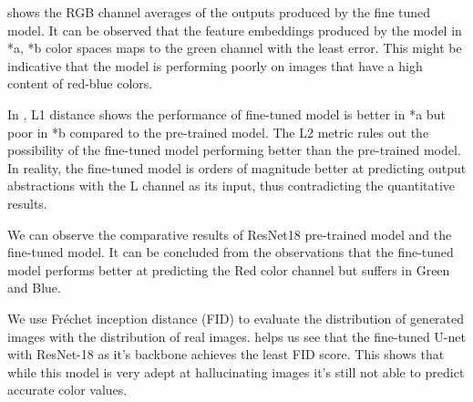 \documentclass[10pt,twocolumn,letterpaper]{article}
\begin{document}
    
     shows the RGB channel averages of the outputs produced by the fine tuned model. It can be observed that the feature embeddings produced by the model in *a, *b color spaces maps to the green channel with the least error. This might be indicative that the model is performing poorly on images that have a high content of red-blue colors. 
     
In , L1 distance shows the performance of fine-tuned model is better in *a but poor in *b compared to the pre-trained model. The L2 metric rules out the possibility of the fine-tuned model performing better than the pre-trained model. In reality, the fine-tuned model is orders of magnitude better at predicting output abstractions with the L channel as its input, thus contradicting the quantitative results.
    
    We can observe the comparative results of ResNet18 pre-trained model and the fine-tuned model. It can be concluded from the observations that the fine-tuned model performs better at predicting the Red color channel but suffers in Green and Blue.
    
    We use Fréchet inception distance (FID) to evaluate the distribution of generated images with the distribution of real images.  helps us see that the fine-tuned U-net with ResNet-18 as it's backbone achieves the least FID score. This shows that while this model is very adept at hallucinating images it's still not able to predict accurate color values. 
\end{document}
